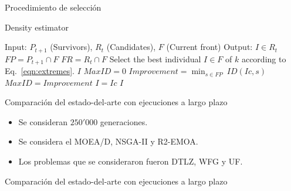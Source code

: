 \documentclass{beamer}
\begin{document}
\begin{frame}{Procedimiento de selección}
\begin{algorithm}[H]
	\caption{Density estimator} 
\begin{scriptsize}
\begin{algorithmic}
\STATE Input: $P_{t+1}$ (Survivors), $R_t$ (Candidates), $F$ (Current front)
    	\STATE Output: $I \in R_t$ 
	\STATE $FP = P_{t+1} \cap F$ \label{alg:FP}
	\STATE $FR = R_{t} \cap F$ \label{alg:FR}
        \label{alg:density_for}
	      \STATE Select the best individual $I \in F$ of $k$ according to Eq.~\ref{eqn:extremes}.\label{alg:density_1}
	  	 \RETURN $I$ \label{alg:density_2}
	  	\ENDIF
	\ENDFOR\label{alg:density_endfor}
	\STATE $MaxID = 0$ \label{alg:density_for2}
	\STATE $Improvement = \displaystyle{\min_{s \in FP}\ ID(Ic, s)}$ 
	 \label{alg:density_if2}
	   \STATE $MaxID = Improvement$
	   \STATE $I = Ic$ 
	\ENDIF \label{alg:density_endif2}
	\ENDFOR	\label{alg:density_endfor2}
    	\RETURN $I$ \label{alg:density_4}
	\end{algorithmic}
\end{scriptsize}
\end{algorithm}
\end{frame}


\begin{frame}{Comparación del estado-del-arte con ejecuciones a largo plazo}
\begin{itemize}
\scriptsize
\item Se consideran $250'000$ generaciones.
\item Se considera el MOEA/D, NSGA-II y R2-EMOA.
\item Los problemas que se consideraron fueron DTLZ, WFG y UF.
\end{itemize}


\end{frame}

\begin{frame}{Comparación del estado-del-arte con ejecuciones a largo plazo}

\end{frame}




\end{document}
